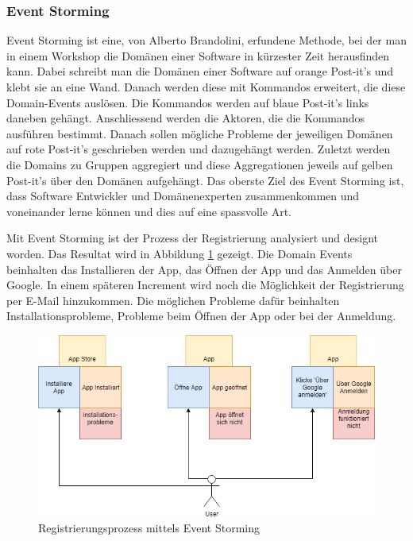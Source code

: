 \subsubsection{Event Storming}
Event Storming ist eine, von Alberto Brandolini, erfundene Methode, bei der man in einem Workshop die Domänen einer Software in kürzester Zeit herausfinden kann. Dabei schreibt man die Domänen einer Software auf orange Post-it's und klebt sie an eine Wand. Danach werden diese mit Kommandos erweitert, die diese Domain-Events auslösen. Die Kommandos werden auf blaue Post-it's links daneben gehängt. Anschliessend werden die Aktoren, die die Kommandos ausführen bestimmt. Danach sollen mögliche Probleme der jeweiligen Domänen auf rote Post-it's geschrieben werden und dazugehängt werden. Zuletzt werden die Domains zu Gruppen aggregiert und diese Aggregationen jeweils auf gelben Post-it's über den Domänen aufgehängt. Das oberste Ziel des Event Storming ist, dass Software Entwickler und Domänenexperten zusammenkommen und voneinander lerne können und dies auf eine spassvolle Art.

Mit Event Storming ist der Prozess der Registrierung analysiert und designt worden. Das Resultat wird in Abbildung \ref{fig:event_storming_registrierung} gezeigt. Die Domain Events beinhalten das Installieren der App, das Öffnen der App und das Anmelden über Google. In einem späteren Increment wird noch die Möglichkeit der Registrierung per E-Mail hinzukommen. Die möglichen Probleme dafür beinhalten Installationsprobleme, Probleme beim Öffnen der App oder bei der Anmeldung.

\begin{figure}[htpb]
    \centering
    \includegraphics[width=\textwidth]{images/Event_Storming_Registrieren.jpg}
    \caption{Registrierungsprozess mittels Event Storming}
    \label{fig:event_storming_registrierung}
\end{figure}

